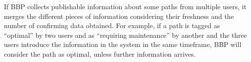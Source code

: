 If BBP collects publishable information about some paths from multiple users, it merges the different pieces of information considering their freshness and the number of confirming data obtained. For example, if a path is tagged as “optimal” by two users and as “requiring maintenance” by another and the three users introduce the information in the system in the same timeframe, BBP will consider the path as optimal, unless further information arrives.